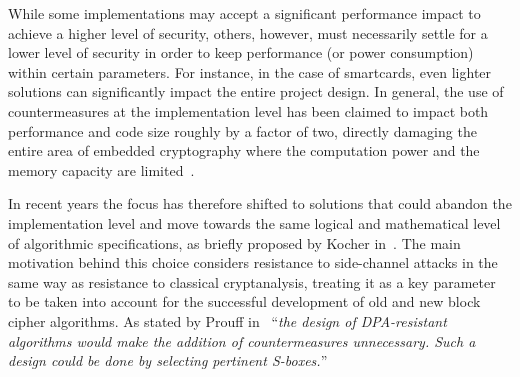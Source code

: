     While some implementations may accept a significant performance impact to achieve a higher level of security, others, however, must necessarily settle for a lower level of security in order to keep performance (or power consumption) within certain parameters. For instance, in the case of smartcards, even lighter solutions can significantly impact the entire project design. In general, the use of countermeasures at the implementation level has been claimed to impact both performance and code size roughly by a factor of two, directly damaging the entire area of embedded cryptography where the computation power and the memory capacity are limited~\cite{prouff2005dpa}. 
    
    In recent years the focus has therefore shifted to solutions that could abandon the implementation level and move towards the same logical and mathematical level of algorithmic specifications, as briefly proposed by Kocher in~\cite{kocher2011introduction}. The main motivation behind this choice considers resistance to side-channel attacks in the same way as resistance to classical cryptanalysis, treating it as a key parameter to be taken into account for the successful development of old and new block cipher algorithms. As stated by Prouff in~\cite{prouff2005dpa} ``\emph{the design of DPA-resistant algorithms would make the addition of countermeasures unnecessary. Such a design could be done by selecting pertinent S-boxes.}''




    

